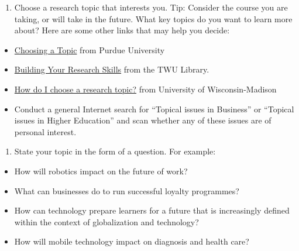 \documentclass[
]{book}
\providecommand{\tightlist}{%
  \setlength{\itemsep}{0pt}\setlength{\parskip}{0pt}}
\theoremstyle{definition}
\theoremstyle{definition}
\theoremstyle{definition}
\theoremstyle{definition}
\theoremstyle{remark}
\begin{document}
\begin{reflect}
\begin{enumerate}
\def\labelenumi{\arabic{enumi}.}
\tightlist
\item
  Choose a research topic that interests you. Tip: Consider the course you are taking, or will take in the future. What key topics do you want to learn more about? Here are some other links that may help you decide:
\end{enumerate}

\begin{itemize}
\tightlist
\item
  \href{https://owl.purdue.edu/owl/general_writing/common_writing_assignments/research_papers/choosing_a_topic.html}{Choosing a Topic} from Purdue University
\item
  \href{https://libguides.twu.ca/ResearchSkills/Home}{Building Your Research Skills} from the TWU Library.
\item
  \href{https://www.library.wisc.edu/college/research-help/how-do-i/how-do-i-choose-a-research-topic/}{How do I choose a research topic?} from University of Wisconsin-Madison
\item
  Conduct a general Internet search for ``Topical issues in Business'' or ``Topical issues in Higher Education'' and scan whether any of these issues are of personal interest.
\end{itemize}

\begin{enumerate}
\def\labelenumi{\arabic{enumi}.}
\setcounter{enumi}{1}
\tightlist
\item
  State your topic in the form of a question. For example:\\
\end{enumerate}

\begin{itemize}
\tightlist
\item
  How will robotics impact on the future of work?\\
\item
  What can businesses do to run successful loyalty programmes?\\
\item
  How can technology prepare learners for a future that is increasingly defined within the context of globalization and technology?\\
\item
  How will mobile technology impact on diagnosis and health care?
\end{itemize}


\end{reflect}
\end{document}
